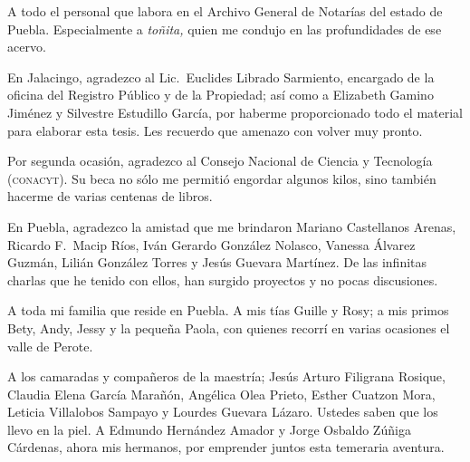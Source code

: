 \documentclass[14pt,twoside,final]{extbook} %
\begin{document}
A todo el personal que labora en el Archivo General de Notarías del estado de Puebla. Especialmente a \emph{toñita,} quien me condujo en las profundidades de ese acervo.

En Jalacingo, agradezco al Lic.~Euclides Librado Sarmiento, encargado de la oficina del Registro Público y de la Propiedad; así como a Elizabeth Gamino Jiménez y Silvestre Estudillo García, por haberme proporcionado todo el material para elaborar esta tesis. Les recuerdo que amenazo con volver muy pronto.

Por segunda ocasión, agradezco al Consejo Nacional de Ciencia y Tecnología (\textsc{conacyt}). Su beca no sólo me permitió engordar algunos kilos, sino también hacerme de varias centenas de libros.

En Puebla, agradezco la amistad que me brindaron Mariano Castellanos Arenas, Ricardo F.~Macip Ríos, Iván Gerardo González Nolasco, Vanessa Álvarez Guzmán, Lilián González Torres y Jesús Guevara Martínez. De las infinitas charlas que he tenido con ellos, han surgido proyectos y no pocas discusiones.

A toda mi familia que reside en Puebla. A mis tías Guille y Rosy; a mis primos Bety, Andy, Jessy y la pequeña Paola, con quienes recorrí en varias ocasiones el valle de Perote.

A los camaradas y compañeros de la maestría; Jesús Arturo Filigrana Rosique, Claudia Elena García Marañón, Angélica Olea Prieto, Esther Cuatzon Mora, Leticia Villalobos Sampayo y Lourdes Guevara Lázaro. Ustedes saben que los llevo en la piel. A Edmundo Hernández Amador y Jorge Osbaldo Zúñiga Cárdenas, ahora mis hermanos, por emprender juntos esta temeraria aventura.
\end{document}

